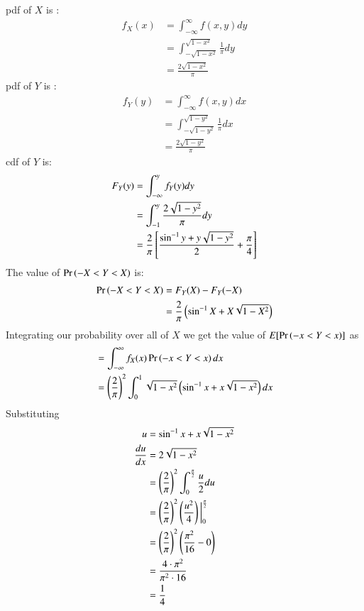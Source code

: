pdf of $X$ is :
\begin{align}
    f_X(x)&=\int_{-\infty}^{\infty}f(x,y)dy\\
    &=\int_{-\sqrt{1-x^2}}^{\sqrt{1-x^2}}\frac{1}{\pi}dy\\
    &=\frac{2\sqrt{1-x^2}}{\pi}
\end{align}
pdf of $Y$ is :
\begin{align}
    f_Y(y)&=\int_{-\infty}^{\infty}f(x,y)dx\\
    &=\int_{-\sqrt{1-y^2}}^{\sqrt{1-y^2}}\frac{1}{\pi}dx\\
    &=\frac{2\sqrt{1-y^2}}{\pi}
\end{align}
cdf of $Y$ is:
\begin{align}
    F_Y(y)&=\int_{-\infty}^{y}f_Y(y)dy\\
    &=\int_{-1}^{y}\frac{2\sqrt{1-y^2}}{\pi}dy\\
    &=\frac{2}{\pi}{}\left[\dfrac{\sin^{-1}{y} + y\sqrt{1-y^2}}{2} + \frac{\pi}{4}\right]
\end{align}
The value of $\Pr\left(-X<Y<X\right)$ is:
\begin{align}
\Pr\left(-X<Y<X\right) &=F_Y(X)-F_Y(-X)\\
 &=\frac{2}{\pi}\left(\sin^{-1}{X} + X\sqrt{1-X^2}\right)
\end{align}
Integrating our probability over all of $X$ we get the value of $ E[\Pr\left(-x<Y<x\right)]$ as 
\begin{align}
&=\int_{-\infty}^{\infty}f_X(x)\Pr\left(-x<Y<x\right)dx\\
    &=\left(\frac{2}{\pi}\right)^2\int_0^1\sqrt{1-x^2}\left(\sin^{-1}{x} + x\sqrt{1-x^2}\right)dx
\end{align}
Substituting
\begin{align} 
u &= \sin^{-1}{x} + x\sqrt{1-x^2}\\
\frac{du}{dx} &= 2\sqrt{1-x^2}\\
&=\left(\frac{2}{\pi}\right)^2\int_0^{\frac{\pi}{2}}\frac{u}{2}du\\
&=\left(\frac{2}{\pi}\right)^2\left(\frac{u^2}{4}\right) \bigg |_0^{\frac{\pi}{2}}\\
&=\left(\frac{2}{\pi}\right)^2\left(\frac{\pi^2}{16} - 0\right)\\
    &=\frac{4\cdot{\pi}^2}{{\pi}^2\cdot16}\\
    &=\frac{1}{4}
    \end{align}